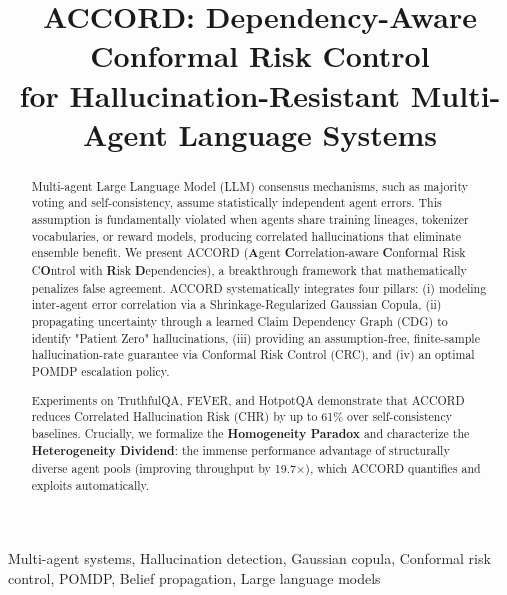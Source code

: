 \documentclass[conference]{IEEEtran}
\begin{document}
\title{ACCORD: Dependency-Aware Conformal Risk Control\\
for Hallucination-Resistant Multi-Agent Language Systems}

\author{
}

\maketitle

\begin{abstract}
Multi-agent Large Language Model (LLM) consensus mechanisms, such as majority voting and self-consistency, assume statistically independent agent errors. This assumption is fundamentally violated when agents share training lineages, tokenizer vocabularies, or reward models, producing correlated hallucinations that eliminate ensemble benefit. We present ACCORD (\textbf{A}gent \textbf{C}orrelation-aware \textbf{C}onformal Risk C\textbf{O}ntrol with \textbf{R}isk \textbf{D}ependencies), a breakthrough framework that mathematically penalizes false agreement. ACCORD systematically integrates four pillars: (i) modeling inter-agent error correlation via a Shrinkage-Regularized Gaussian Copula, (ii) propagating uncertainty through a learned Claim Dependency Graph (CDG) to identify "Patient Zero" hallucinations, (iii) providing an assumption-free, finite-sample hallucination-rate guarantee via Conformal Risk Control (CRC), and (iv) an optimal POMDP escalation policy. 

Experiments on TruthfulQA, FEVER, and HotpotQA demonstrate that ACCORD reduces Correlated Hallucination Risk (CHR) by up to 61\% over self-consistency baselines. Crucially, we formalize the \textbf{Homogeneity Paradox} and characterize the \textbf{Heterogeneity Dividend}: the immense performance advantage of structurally diverse agent pools (improving throughput by 19.7$\times$), which ACCORD quantifies and exploits automatically.
\end{abstract}

\begin{IEEEkeywords}
Multi-agent systems, Hallucination detection, Gaussian copula, Conformal risk control, POMDP, Belief propagation, Large language models
\end{IEEEkeywords}
\end{document}
